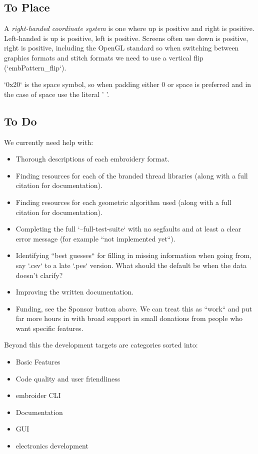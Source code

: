 \documentclass{report}
\begin{document}
\subsection{To Place}

A \emph{right-handed coordinate system} is one where up is positive and right is
positive. Left-handed is up is positive, left is positive. Screens often use
down is positive, right is positive, including the OpenGL standard so when
switching between graphics formats and stitch formats we need to use a vertical
flip (`embPattern\_flip`).

`0x20` is the space symbol, so when padding either 0 or space is preferred and in the case of space use the literal ' '.

\subsection{To Do}

We currently need help with:

\begin{itemize}
\item Thorough descriptions of each embroidery format.
\item Finding resources for each of the branded thread libraries (along with a full citation for documentation).
\item Finding resources for each geometric algorithm used (along with a full citation for documentation).
\item Completing the full `--full-test-suite`  with no segfaults and at least a clear error message (for example ``not implemented yet``).
\item Identifying ``best guesses`` for filling in missing information when going from, say `.csv` to a late `.pes` version. What should the default be when the data doesn't clarify?
\item Improving the written documentation.
\item Funding, see the Sponsor button above. We can treat this as ``work`` and put far more hours in with broad support in small donations from people who want specific features.
\end{itemize}

Beyond this the development targets are categories sorted into:

\begin{itemize}
\item Basic Features
\item Code quality and user friendliness
\item embroider CLI
\item Documentation
\item GUI
\item electronics development
\end{itemize}
\end{document}
